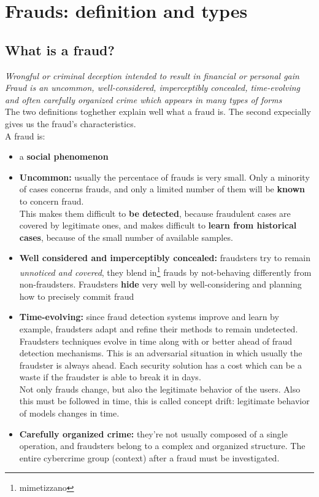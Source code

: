 \chapter{Frauds: definition and types}
\section{What is a fraud?}
    \textit{Wrongful or criminal deception intended to result in financial or personal gain}\\
    \textit{Fraud is an uncommon, well-considered, imperceptibly concealed, time-evolving and often carefully organized crime which appears in many types of forms}\\
    The two definitions toghether explain well what a fraud is. The second expecially gives us the fraud's characteristics.\\
    A fraud is:
    \begin{itemize}
        \item a \textbf{social phenomenon}
        \item \textbf{Uncommon:} usually the percentace of frauds is very small. Only a minority of cases concerns frauds, and only a limited number of them will be \textbf{known} to concern fraud.\\
        This makes them difficult to \textbf{be detected}, because fraudulent cases are covered by legitimate ones, and makes difficult to \textbf{learn from historical cases}, because of the small number of available samples.
        \item \textbf{Well considered and imperceptibly concealed:} fraudsters try to remain \textit{unnoticed and covered}, they blend in\footnote{mimetizzano} frauds by not-behaving differently from non-fraudsters. Fraudsters \textbf{hide} very well by well-considering and planning how to precisely commit fraud
        \item \textbf{Time-evolving:} since fraud detection systems improve and learn by example, fraudsters adapt and refine their methods to remain undetected. Fraudsters techniques evolve in time along with or better ahead of fraud detection mechanisms. This is an adversarial situation in which usually the fraudster is always ahead. Each security solution has a cost which can be a waste if the fraudster is able to break it in days.\\
        Not only frauds change, but also the legitimate behavior of the users. Also this must be followed in time, this is called concept drift: legitimate behavior of models changes in time.
        \item \textbf{Carefully organized crime:} they're not usually composed of a single operation, and fraudsters belong to a complex and organized structure. The entire cybercrime group (context) after a fraud must be investigated.
    \end{itemize}
